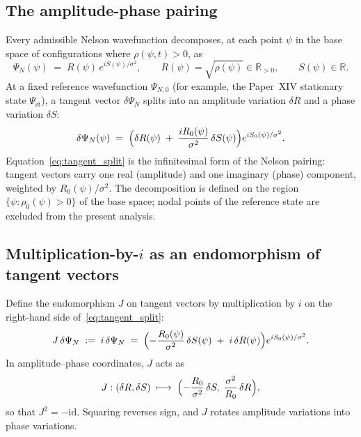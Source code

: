\documentclass[12pt]{article}
\begin{document}
\subsection{The amplitude-phase pairing}\label{subsec:amp_phase}

Every admissible Nelson wavefunction decomposes, at each point $\psi$ in the base space of configurations where $\rho(\psi, t) > 0$, as
\begin{equation}\label{eq:amp_phase_pair}
    \Psi_N(\psi) \;=\; R(\psi)\, e^{iS(\psi)/\sigma^2},
    \qquad R(\psi) = \sqrt{\rho(\psi)} \in \mathbb{R}_{>0},
    \qquad S(\psi) \in \mathbb{R}.
\end{equation}
At a fixed reference wavefunction $\Psi_{N,0}$ (for example, the Paper~XIV stationary state $\Psi_{\mathrm{st}}$), a tangent vector $\delta\Psi_N$ splits into an amplitude variation $\delta R$ and a phase variation $\delta S$:
\begin{equation}\label{eq:tangent_split}
    \delta\Psi_N(\psi) \;=\; \Bigl(\delta R(\psi) \;+\; \frac{i R_0(\psi)}{\sigma^2}\, \delta S(\psi)\Bigr) e^{iS_0(\psi)/\sigma^2}.
\end{equation}
Equation~\eqref{eq:tangent_split} is the infinitesimal form of the Nelson pairing: tangent vectors carry one real (amplitude) and one imaginary (phase) component, weighted by $R_0(\psi)/\sigma^2$. The decomposition is defined on the region $\{\psi : \rho_0(\psi) > 0\}$ of the base space; nodal points of the reference state are excluded from the present analysis.

\subsection{Multiplication-by-$i$ as an endomorphism of tangent vectors}\label{subsec:J}

Define the endomorphism $J$ on tangent vectors by multiplication by $i$ on the right-hand side of~\eqref{eq:tangent_split}:
\begin{equation}\label{eq:J_def}
    J\,\delta\Psi_N \;:=\; i\, \delta\Psi_N
    \;=\; \Bigl(-\frac{R_0(\psi)}{\sigma^2}\,\delta S(\psi) \;+\; i\,\delta R(\psi)\Bigr) e^{iS_0(\psi)/\sigma^2}.
\end{equation}
In amplitude--phase coordinates, $J$ acts as
\begin{equation}\label{eq:J_matrix}
    J: (\delta R, \delta S) \;\longmapsto\; \Bigl(-\frac{R_0}{\sigma^2}\,\delta S,\; \frac{\sigma^2}{R_0}\,\delta R\Bigr),
\end{equation}
so that $J^2 = -\mathrm{id}$. Squaring reverses sign, and $J$ rotates amplitude variations into phase variations.
\end{document}
